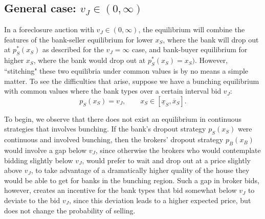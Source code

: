 \documentclass[11pt,twopage]{article}
\begin{document}
\subsection{General case: $v_J \in (0,\infty)$}

In a foreclosure auction with  $v_J\in (0,\infty)$, the equilibrium will combine the features of the bank-seller equilibrium for lower $x_S$, where the bank will drop out at $p_S^*(x_S)$ as described for the $v_J=\infty$ case, and bank-buyer equilibrium for higher $x_S$, where the bank would drop out at $p_S^*(x_S) = x_S)$. However, ``stitching" these two equilibria under common values  is by no means a simple matter. To see the difficulties that arise, suppose we have a bunching equilibrium with common values where the bank types over a certain interval bid $v_J$: 
\[ p_S(x_S) = v_J, \quad\quad x_S \in [\underline x_S,\overline x_S] .\]

To begin, we observe that there does not exist an equilibrium in continuous strategies that involves bunching. 
If the bank's dropout strategy $p_S(x_S)$ were continuous and involved bunching, then the brokers' dropout strategy $p_B(x_B)$ would involve a gap below $v_J$, since otherwise the brokers who would contemplate bidding slightly below $v_J$, would prefer to wait and drop out at a price slightly above $v_J$, to take advantage of a dramatically higher quality of the house they would be able to get for banks in the bunching region. Such a gap in broker bids, however, creates an incentive for the bank types that bid somewhat below $v_J$ to deviate to the bid $v_J$, since this deviation leads to a higher expected price, but does not change the probability of selling.

  
\end{document}
